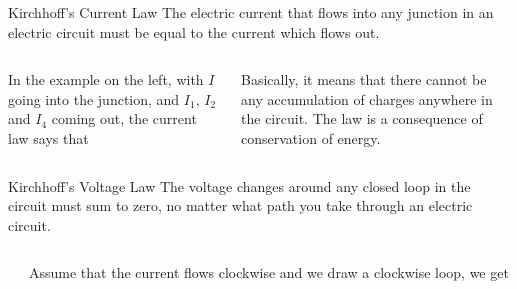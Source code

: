 \documentclass[12pt,aspectratio=169]{beamer}
\begin{document}
\begin{frame}{Kirchhoff's Current Law}
  The electric current that flows into any junction in an electric circuit must
  be equal to the current which flows out.

  \vspace{.2in}
  \begin{columns}

    In the example on the left, with $I$ going into the junction, and $I_1$,
    $I_2$ and $I_4$ coming out, the current law says that


    \vspace{-.1in}Basically, it means that there cannot be any accumulation of
    charges anywhere in the circuit. The law is a consequence of conservation of
    energy.
  \end{columns}
\end{frame}



\begin{frame}{Kirchhoff's Voltage Law}
  The voltage changes around any closed loop in the circuit must sum to zero,
  no matter what path you take through an electric circuit.

  \vspace{.1in}
  \begin{columns}
    \begin{center}
    \end{center}
    Assume that the current flows clockwise and we draw a clockwise loop, we
    get

  \end{columns}
\end{frame}
\end{document}
